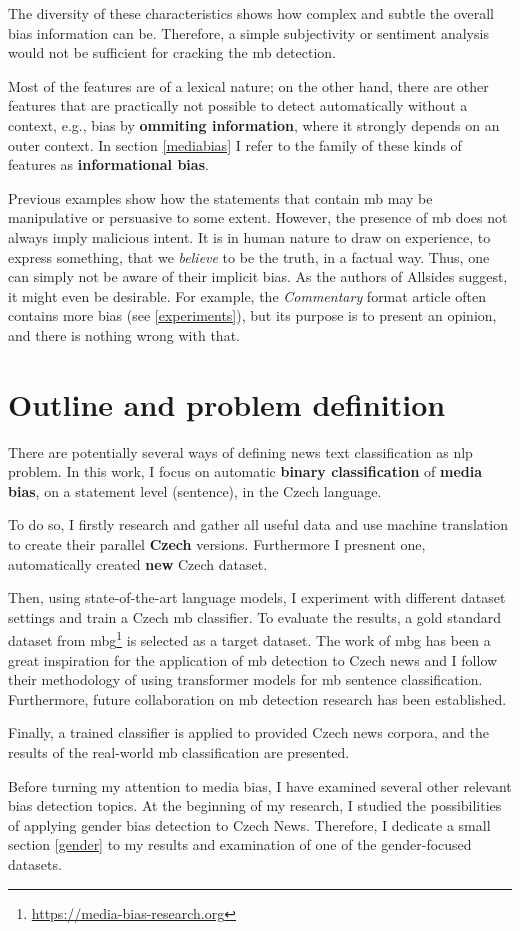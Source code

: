 The diversity of these characteristics shows how complex and subtle the overall bias information can be. Therefore, a simple subjectivity or sentiment analysis would not be sufficient for cracking the \gls{mb} detection. 

Most of the features are of a lexical nature; on the other hand, there are other features that are practically not possible to detect automatically without a context, e.g., bias by \textbf{ommiting information}, where it strongly depends on an outer context. In section \ref{mediabias} I refer to the family of these kinds of features as \textbf{informational bias}.


Previous examples show how the statements that contain \gls{mb} may be manipulative or persuasive to some extent. However, the presence of \gls{mb} does not always imply malicious intent. It is in human nature to draw on experience, to express something, that we \textit{believe} to be the truth, in a factual way. Thus, one can simply not be aware of their implicit bias. As the authors of Allsides suggest, it might even be desirable. For example, the \textit{Commentary} format article often contains more bias (see \ref{experiments}), but its purpose is to present an opinion, and there is nothing wrong with that.


\section{Outline and problem definition}
There are potentially several ways of defining news text classification as \gls{nlp} problem.
In this work, I focus on automatic \textbf{binary classification} of \textbf{media bias}, on a statement level (sentence), in the Czech language.

To do so, I firstly research and gather all useful data and use machine translation to create their parallel \textbf{Czech} versions. Furthermore I presnent one, automatically created \textbf{new} Czech dataset. 

Then, using state-of-the-art language models, I experiment with different dataset settings and train a Czech \gls{mb} classifier. To evaluate the results, a gold standard dataset from \gls{mbg}\footnote{\url{https://media-bias-research.org}} is selected as a target dataset. The work of \gls{mbg} has been a great inspiration for the application of \gls{mb} detection to Czech news and I follow their methodology of using transformer models for \gls{mb} sentence classification. Furthermore, future collaboration on \gls{mb} detection research has been established.

Finally, a trained classifier is applied to provided Czech news corpora, and the results of the real-world \gls{mb} classification are presented.

Before turning my attention to media bias, I have examined several other relevant bias detection topics. At the beginning of my research, I studied the possibilities of applying gender bias detection to Czech News. Therefore, I dedicate a small section \ref{gender} to my results and examination of one of the gender-focused datasets.



\let\cleardoublepage\clearpage